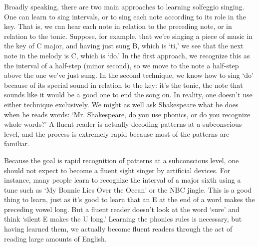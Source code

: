 \documentclass{sight}
\begin{document}
\pagebreak[3]\par
\vspace{5mm}\begin{samepage}Broadly speaking, there are two main approaches to learning solfeggio singing. One can learn to sing intervals, or to sing each note according to its role in the key. That is, we can hear each note in relation to the preceding note, or in relation to the tonic. Suppose, for example, that we're singing a piece of music in the key of C major, and having just sung B, which is `ti,' we see that the next note in the melody is C, which is `do.' In the first approach, we recognize this as the interval of a half-step (minor second), so we move to the note a half-step above the one we've just sung. In the second technique, we know how to sing `do' because of its special sound in relation to the key: it's the tonic, the note that sounds like it would be a good one to end the song on. In reality, one doesn't use either technique exclusively. We might as well ask Shakespeare what he does when he reads words: `Mr. Shakespeare, do you use phonics, or do you recognize whole words?' A fluent reader is actually decoding patterns at a subconscious level, and the process is extremely rapid because most of the patterns are familiar.\\
\end{samepage}


\pagebreak[3]\par
\vspace{5mm}\begin{samepage}Because the goal is rapid recognition of patterns at a subconscious level, one should not expect to become a fluent sight singer by artificial devices. For instance, many people learn to recognize the interval of a major sixth using a tune such as `My Bonnie Lies Over the Ocean' or the NBC jingle. This is a good thing to learn, just as it's good to learn that an E at the end of a word makes the preceding vowel long. But a fluent reader doesn't look at the word `sure' and think `silent E makes the U long.' Learning the phonics rules is necessary, but having learned them, we actually become fluent readers through the act of reading large amounts of English.\\
\end{samepage}
\end{document}
